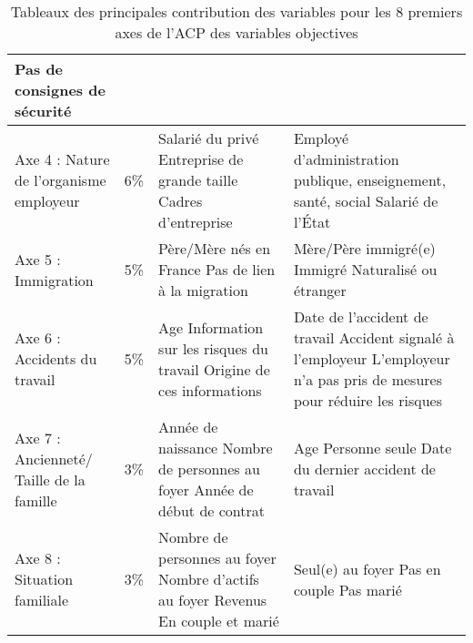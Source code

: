 \documentclass[11pt,fleqn,openany,frenchb]{book} %
\begin{document}
\begin{table}[!h]
\begin{tabular}{|p{3cm}|c|p{4.5cm}|p{4.5cm}|}
    \newline Pas de consignes de sécurité\\
    \hline
    Axe 4 : Nature de l'organisme employeur & 6\%
    & Salarié du privé
    \newline Entreprise de grande taille
    \newline Cadres d'entreprise
    & Employé d'administration publique, enseignement, santé, social
    \newline Salarié de l'\'Etat \\
    \hline
    Axe 5 : Immigration & 5\%
    & Père/Mère nés en France
    \newline Pas de lien à la migration 
    & Mère/Père immigré(e)
    \newline Immigré
    \newline Naturalisé ou étranger\\
    \hline  
    Axe 6 : Accidents du travail & 5\%
    & Age
    \newline Information sur les risques du travail
    \newline Origine de ces informations
    & Date de l'accident de travail
    \newline Accident signalé à l'employeur
    \newline L'employeur n'a pas pris de mesures pour réduire les risques \\
    \hline
    Axe 7 : Ancienneté/ Taille de la famille & 3\%  %
    & Année de naissance
    \newline Nombre de personnes au foyer
    \newline Année de début de contrat
    & Age 
    \newline Personne seule
    \newline Date du dernier accident de travail \\
    \hline
    Axe 8 : Situation familiale & 3\%
    & Nombre de personnes au foyer 
    \newline Nombre d'actifs au foyer 
    \newline Revenus
    \newline En couple et marié
    & Seul(e) au foyer
    \newline Pas en couple
    \newline Pas marié \\
    \hline

\end{tabular}%
\caption{Tableaux des principales contribution des variables pour les 8 premiers axes de l’ACP des variables objectives}
\label{tab:ACPobj}
\end{table}
\end{document}
